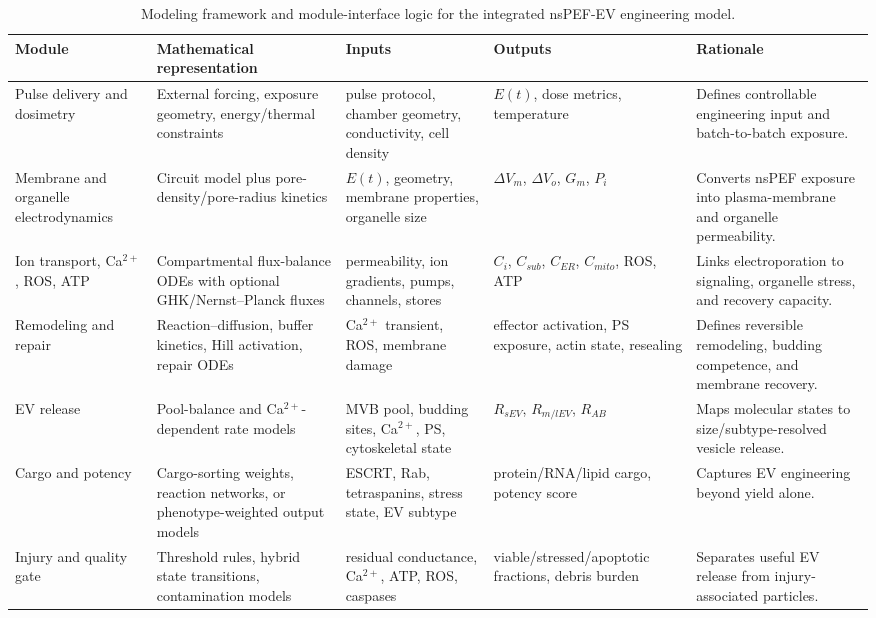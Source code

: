 \documentclass[Afour,sagev,times]{sagej}
\begin{document}

\begin{table}[t]
\footnotesize\sf
\centering
\caption{Modeling framework and module-interface logic for the integrated nsPEF-EV engineering model.\label{T_modeling_framework}}
\begin{tabular}{p{2.8cm} p{3.3cm} p{3.1cm} p{3.1cm} p{3.1cm}}
\toprule
\textbf{Module} & \textbf{Mathematical representation} & \textbf{Inputs} & \textbf{Outputs} & \textbf{Rationale} \\
\midrule
Pulse delivery and dosimetry & External forcing, exposure geometry, energy/thermal constraints & pulse protocol, chamber geometry, conductivity, cell density & $E(t)$, dose metrics, temperature & Defines controllable engineering input and batch-to-batch exposure. \\
Membrane and organelle electrodynamics & Circuit model plus pore-density/pore-radius kinetics & $E(t)$, geometry, membrane properties, organelle size & $\Delta V_m$, $\Delta V_o$, $G_m$, $P_i$ & Converts nsPEF exposure into plasma-membrane and organelle permeability. \\
Ion transport, Ca$^{2+}$, ROS, ATP & Compartmental flux-balance ODEs with optional GHK/Nernst--Planck fluxes & permeability, ion gradients, pumps, channels, stores & $C_i$, $C_{sub}$, $C_{ER}$, $C_{mito}$, ROS, ATP & Links electroporation to signaling, organelle stress, and recovery capacity. \\
Remodeling and repair & Reaction--diffusion, buffer kinetics, Hill activation, repair ODEs & Ca$^{2+}$ transient, ROS, membrane damage & effector activation, PS exposure, actin state, resealing & Defines reversible remodeling, budding competence, and membrane recovery. \\
EV release & Pool-balance and Ca$^{2+}$-dependent rate models & MVB pool, budding sites, Ca$^{2+}$, PS, cytoskeletal state & $R_{sEV}$, $R_{m/lEV}$, $R_{AB}$ & Maps molecular states to size/subtype-resolved vesicle release. \\
Cargo and potency & Cargo-sorting weights, reaction networks, or phenotype-weighted output models & ESCRT, Rab, tetraspanins, stress state, EV subtype & protein/RNA/lipid cargo, potency score & Captures EV engineering beyond yield alone. \\
Injury and quality gate & Threshold rules, hybrid state transitions, contamination models & residual conductance, Ca$^{2+}$, ATP, ROS, caspases & viable/stressed/apoptotic fractions, debris burden & Separates useful EV release from injury-associated particles. \\

\end{tabular}
\end{table}
\end{document}
